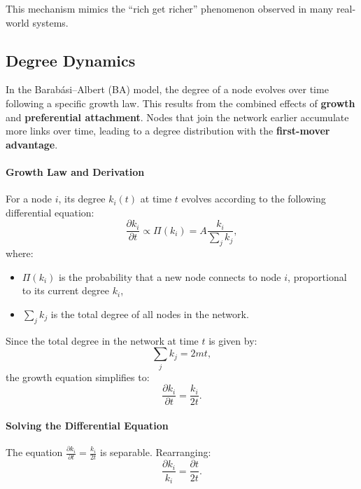 \documentclass{article}
\begin{document}
This mechanism mimics the ``rich get richer'' phenomenon observed in many real-world systems.




\subsection{Degree Dynamics}

In the Barabási–Albert (BA) model, the degree of a node evolves over time following a specific growth law. This results from the combined effects of \textbf{growth} and \textbf{preferential attachment}. Nodes that join the network earlier accumulate more links over time, leading to a degree distribution with the \textbf{first-mover advantage}.

\paragraph{Growth Law and Derivation}
For a node \( i \), its degree \( k_i(t) \) at time \( t \) evolves according to the following differential equation:
\begin{equation}
\frac{\partial k_i}{\partial t} \propto \Pi(k_i) = A \frac{k_i}{\sum_j k_j},
\end{equation}
where:
\begin{itemize}
    \item \( \Pi(k_i) \) is the probability that a new node connects to node \( i \), proportional to its current degree \( k_i \),
    \item \( \sum_j k_j \) is the total degree of all nodes in the network.
\end{itemize}

Since the total degree in the network at time \( t \) is given by:
\begin{equation}
\sum_j k_j = 2mt,
\end{equation}
the growth equation simplifies to:
\begin{equation}
\frac{\partial k_i}{\partial t} = \frac{k_i}{2t}.
\end{equation}

\paragraph{Solving the Differential Equation}
The equation \( \frac{\partial k_i}{\partial t} = \frac{k_i}{2t} \) is separable. Rearranging:
\begin{equation}
\frac{\partial k_i}{k_i} = \frac{\partial t}{2t}.
\end{equation}
\end{document}
